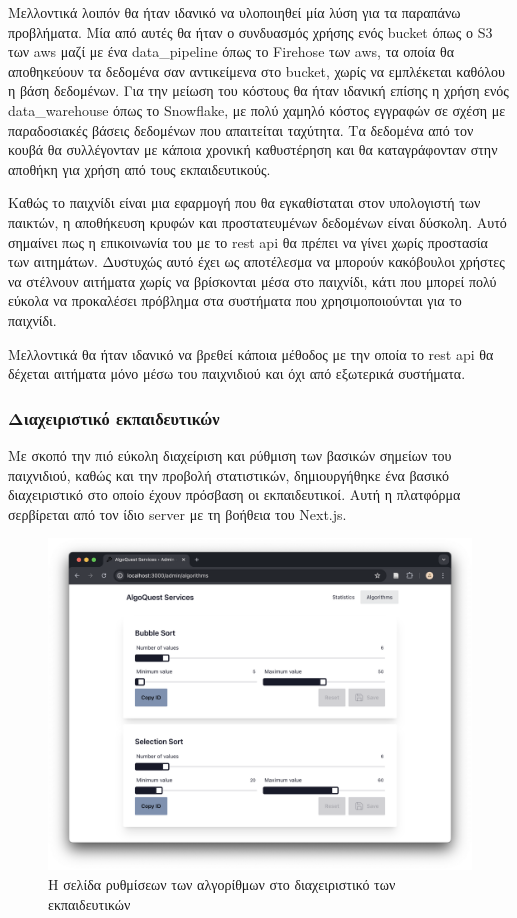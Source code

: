 Μελλοντικά λοιπόν θα ήταν ιδανικό να υλοποιηθεί μία λύση για τα παραπάνω προβλήματα. Μία από αυτές θα ήταν ο συνδυασμός χρήσης ενός \gls{bucket} όπως ο S3 των \acrfull{aws}\cite{noauthor_amazon_nodate} μαζί με ένα \gls{data_pipeline} όπως το Firehose των \acrshort{aws}\cite{noauthor_amazon_nodate-1}, τα οποία θα αποθηκεύουν τα δεδομένα σαν αντικείμενα στο \gls{bucket}, χωρίς να εμπλέκεται καθόλου η βάση δεδομένων. Για την μείωση του κόστους θα ήταν ιδανική επίσης η χρήση ενός \gls{data_warehouse} όπως το Snowflake\cite{noauthor_snowflake_nodate}, με πολύ χαμηλό κόστος εγγραφών σε σχέση με παραδοσιακές βάσεις δεδομένων που απαιτείται ταχύτητα. Τα δεδομένα από τον κουβά θα συλλέγονταν με κάποια χρονική καθυστέρηση και θα καταγράφονταν στην αποθήκη για χρήση από τους εκπαιδευτικούς.

Καθώς το παιχνίδι είναι μια εφαρμογή που θα εγκαθίσταται στον υπολογιστή των παικτών, η αποθήκευση κρυφών και προστατευμένων δεδομένων είναι δύσκολη. Αυτό σημαίνει πως η επικοινωνία του με το \acrshort{rest} \acrshort{api} θα πρέπει να γίνει χωρίς προστασία των αιτημάτων. Δυστυχώς αυτό έχει ως αποτέλεσμα να μπορούν κακόβουλοι χρήστες να στέλνουν αιτήματα χωρίς να βρίσκονται μέσα στο παιχνίδι, κάτι που μπορεί πολύ εύκολα να προκαλέσει πρόβλημα στα συστήματα που χρησιμοποιούνται για το παιχνίδι.

Μελλοντικά θα ήταν ιδανικό να βρεθεί κάποια μέθοδος με την οποία το \acrshort{rest} \acrshort{api} θα δέχεται αιτήματα μόνο μέσω του παιχνιδιού και όχι από εξωτερικά συστήματα.


\subsubsection{Διαχειριστικό εκπαιδευτικών}\label{sssec:admin_dashboard}

Με σκοπό την πιό εύκολη διαχείριση και ρύθμιση των βασικών σημείων του παιχνιδιού, καθώς και την προβολή στατιστικών, δημιουργήθηκε ένα βασικό διαχειριστικό στο οποίο έχουν πρόσβαση οι εκπαιδευτικοί. Αυτή η πλατφόρμα σερβίρεται από τον ίδιο \gls{server} με τη βοήθεια του Next.js.

\begin{figure}[H]
    \centering
    \includegraphics[width=0.7\linewidth]{sections/4/1/images/admin_dashboard_algorithm_config}
    \caption{Η σελίδα ρυθμίσεων των αλγορίθμων στο διαχειριστικό των εκπαιδευτικών}
    \label{fig:admin_dashboard_algorithm_config}
\end{figure}

